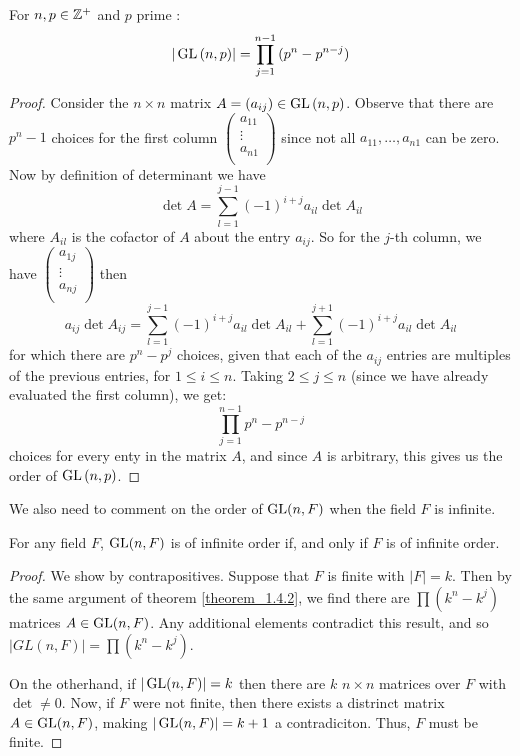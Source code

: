 \begin{theorem}\label{theorem_1.4.2}
  For $n, p \in \mathbb{Z}^+$ and  $p$ prime :
  \begin{equation}
    |\operatorname{GL}{(n,p)}|=\prod_{j=1}^{n-1}{(p^n-p^{n-j})}
  \end{equation}
\end{theorem}
\begin{proof}
  Consider the $n \times n$ matrix $A=(a_{ij}) \in \operatorname{GL}{(n,p)}$.
  Observe that there are $p^n-1$ choices for the first column $
  \begin{pmatrix}
    a_{11}  \\ \vdots  \\ a_{n1} \\
  \end{pmatrix}
  $ since not all $a_{11}, \dots, a_{n1}$ can be zero. Now by
  definition of determinant we have
  \begin{equation*}
    \det{A}=\sum_{l=1}^{j-1}{(-1)^{i+j}a_{il}\det{A_{il}}}
  \end{equation*}
  where $A_{il}$ is the cofactor of $A$ about the entry  $a_{ij}$. So
  for the $j$-th column, we have $
  \begin{pmatrix}
    a_{1j}  \\  \vdots  \\  a_{nj}  \\
  \end{pmatrix}
  $
  then
  \begin{equation*}
    a_{ij}\det{A_{ij}}=\sum_{l=1}^{j-1}{(-1)^{i+j}a_{il}\det{A_{il}}}+
  \sum_{l=1}^{j+1}{(-1)^{i+j}a_{il}\det{A_{il}}}
  \end{equation*}
  for which there are $p^n-p^j$ choices, given that each of the
  $a_{ij}$ entries are multiples of the previous entries, for $1 \leq
  i \leq n$. Taking $2 \leq j \leq n$ (since we have already evaluated
  the first column), we get:
  \begin{equation*}
    \prod_{j=1}^{n-1}{p^n-p^{n-j}}
  \end{equation*}
  choices for every enty in the matrix $A$, and since $A$ is
  arbitrary, this gives us the order of $\operatorname{GL}{(n,p)}$.
\end{proof}

We also need to comment on the order of $\operatorname{GL}(n,F)$ when the field $F$ is
infinite.

\begin{theorem}\label{theorem_1.4.3}
  For any field $F$,  $\operatorname{GL}(n,F)$ is of infinite order if, and only if $F$ is
  of infinite order.
\end{theorem}
\begin{proof}
  We show by contrapositives. Suppose that $F$ is finite with  $|F|=k$.
  Then by the same argument of theorem \ref{theorem_1.4.2}, we find there are
  $\prod{(k^n-k^j)}$ matrices $A \in \operatorname{GL}(n,F)$. Any additional elements
  contradict this result, and so $|GL(n,F)|=\prod{(k^n-k^j)}$.

  On the otherhand, if $|\operatorname{GL}(n,F)|=k$ then there are $k$ $n \times n$
  matrices over  $F$ with $\det \neq 0$. Now, if  $F$ were not finite, then
  there exists a distrinct matrix  $A \in \operatorname{GL}(n,F)$, making $|\operatorname{GL}(n,F)|=k+1$
  a contradiciton. Thus, $F$ must be finite.
\end{proof}


